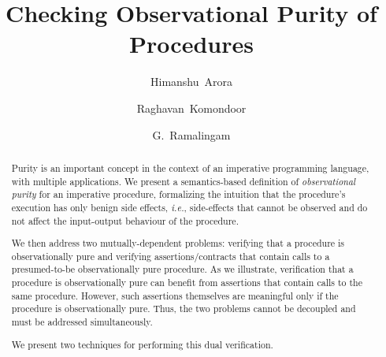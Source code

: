 \documentclass{llncs}
\begin{document}
%
\frontmatter          %
%
\pagestyle{headings}  %
\mainmatter              %
%
\title{Checking Observational Purity of Procedures}
%
%
\author{Himanshu~Arora \and
Raghavan~Komondoor \and
G.~Ramalingam
}
%
%
%

\maketitle              %

\begin{abstract}
Purity is an important concept in the context of an imperative
programming language, with multiple applications.  We present a
semantics-based definition of \emph{observational purity} for an
imperative procedure, formalizing the intuition that the procedure's
execution has only benign side effects, \emph{i.e.}, side-effects that
cannot be observed and
do not affect the input-output behaviour of the procedure.

We then address two mutually-dependent problems: verifying that a
procedure is observationally pure and verifying assertions/contracts
that contain calls to a presumed-to-be observationally pure procedure.
As we illustrate, verification that a procedure is observationally
pure can benefit from assertions that contain calls to the same
procedure.  However, such assertions themselves are meaningful only if
the procedure is observationally pure.
Thus, the two problems cannot be decoupled and must be addressed
simultaneously.


We present two techniques for performing this dual verification.
\end{abstract}
\end{document}
